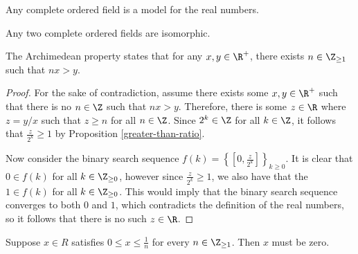 \documentclass[12pt]{article}
\begin{document}
\begin{defn}
    Any complete ordered field is a model for the real numbers.
\end{defn}

\begin{rmk}
    Any two complete ordered fields are isomorphic.
\end{rmk}

\begin{thm}
    The Archimedean property states that for any $x, y \in \R^{+}$, there exists $n \in \Z_{\geq 1}$ such that $nx > y$.
\end{thm}

\begin{proof}
    For the sake of contradiction, assume there exists some $x, y \in \R^{+}$ such that there is no $n \in \Z$ such that $nx > y$. Therefore, there is some $z \in \R$ where $z = y/x$ such that $z \geq n$ for all $n \in \Z$. Since $2^k \in \Z$ for all $k \in \Z$, it follows that $\frac{z}{2^k} \geq 1$ by Proposition \ref{greater-than-ratio}.

    Now consider the binary search sequence $f(k) = \left\{[0, \frac{z}{2^k}]\right\}_{k \geq 0}$. It is clear that $0 \in f(k)$ for all $k \in \Z_{\geq 0}$, however since $\frac{z}{2^k} \geq 1$, we also have that the $1 \in f(k)$ for all $k \in \Z_{\geq 0}$. This would imply that the binary search sequence converges to both $0$ and $1$, which contradicts the definition of the real numbers, so it follows that there is no such $z \in \R$.
\end{proof}

\begin{cor}
    Suppose $x \in R$ satisfies $0 \leq x \leq \frac{1}{n}$ for every $n \in \Z_{\geq 1}$. Then $x$ must be zero.
\end{cor}
\end{document}

